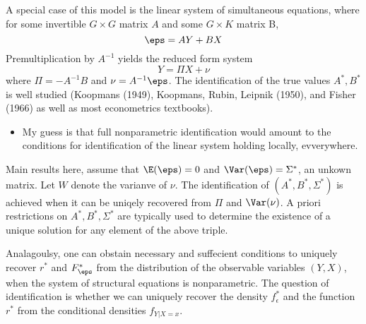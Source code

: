 A special case of this model is the linear system of simultaneous equations, where for some invertible $G \times G$ matrix $A$ and some $G \times K$ matrix B,
\[\eps = AY + BX\]
Premultiplication by $A^{-1}$ yields the reduced form system
\[Y = \Pi X + \nu\] 
where $\Pi = -A^{-1}B$ and $\nu = A^{-1}\eps$. The identification of the true values $A^*, B^*$ is well studied (Koopmans (1949), Koopmans, Rubin, Leipnik (1950), and Fisher (1966) as well as most econometrics textbooks).
\begin{itemize}
  \item My guess is that full nonparametric identification would amount to the conditions for identification of the linear system holding locally, evverywhere.
\end{itemize}
Main results here, assume that $\E(\eps) = 0$ and $\Var(\eps) = \Sigma^*$, an unkown matrix. Let $W$ denote the varianve of $\nu$. The identification of $(A^*, B^*, \Sigma^*)$ is achieved when it can be uniqely recovered from $\Pi$ and $\Var(\nu)$. A priori restrictions on $A^*, B^*, \Sigma^*$ are typically used to determine the existence of a unique solution for any element of the above triple.

Analagoulsy, one can obstain necessary and suffecient conditions to uniquely recover $r^*$ and $F_\eps^*$ from the distribution of the observable variables $(Y,X)$, when the system of structural equations is nonparametric. The question of identification is whether we can uniquely recover the density $f^*_\epsilon$ and the function $r^*$ from the conditional densities $f_{Y|X=x}$. 

